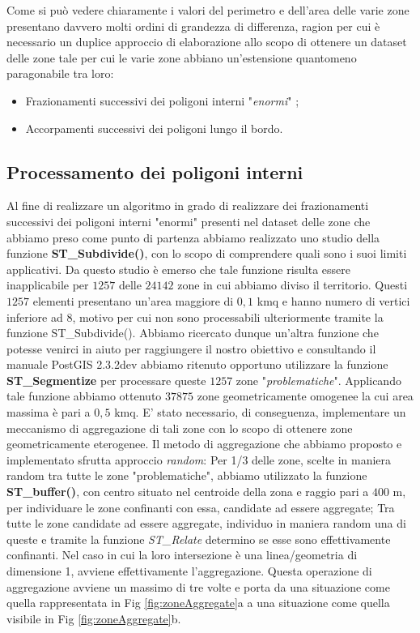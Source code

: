 Come si può vedere chiaramente i valori del perimetro e dell'area delle varie zone presentano davvero molti ordini di grandezza di differenza, ragion per cui è necessario un duplice approccio di elaborazione allo scopo di ottenere un dataset delle zone tale per cui le varie zone abbiano un'estensione quantomeno paragonabile tra loro:
\begin{itemize}
\item Frazionamenti successivi dei poligoni interni "\textit{enormi}" ;
\item Accorpamenti successivi dei poligoni lungo il bordo.
\end{itemize}
\subsection{Processamento dei poligoni interni}
Al fine di realizzare un algoritmo in grado di realizzare dei frazionamenti successivi dei poligoni interni "enormi" presenti nel dataset delle zone che abbiamo preso come punto di partenza abbiamo realizzato uno studio della funzione \textbf{ST\_Subdivide()}, con lo scopo di comprendere quali sono i suoi limiti applicativi. Da questo studio è emerso che tale funzione risulta essere inapplicabile per $1257$ delle $24142$ zone in cui abbiamo diviso il territorio. Questi $1257$ elementi presentano un'area maggiore di $0,1$ kmq e hanno numero di vertici inferiore ad $8$, motivo per cui non sono processabili ulteriormente tramite la funzione ST\_Subdivide().\newline
Abbiamo ricercato dunque un'altra funzione che potesse venirci in aiuto per raggiungere il nostro obiettivo e consultando il manuale PostGIS 2.3.2dev abbiamo ritenuto opportuno utilizzare la funzione \textbf{ST\_Segmentize} per processare queste $1257$ zone "\textit{problematiche}". Applicando tale funzione abbiamo ottenuto $37875$ zone geometricamente omogenee la cui area massima è pari a $0,5$ kmq. E' stato necessario, di conseguenza, implementare un meccanismo di aggregazione di tali zone con lo scopo di ottenere zone geometricamente eterogenee. Il metodo di aggregazione che abbiamo proposto e implementato sfrutta approccio \textit{random}: \newline
Per 1/3 delle zone, scelte in maniera random tra tutte le zone "problematiche", abbiamo utilizzato la funzione \textbf{ST\_buffer()}, con centro situato nel centroide della zona e raggio pari a $400$ m, per individuare le zone confinanti con essa, candidate ad essere aggregate; Tra tutte le zone candidate ad essere aggregate, individuo in maniera random una di queste e tramite la funzione \textit{ST\_Relate} determino se esse sono effettivamente confinanti. Nel caso in cui la loro intersezione è una linea/geometria di dimensione 1, avviene effettivamente l'aggregazione. Questa operazione di aggregazione avviene un massimo di tre volte e porta da una situazione come quella rappresentata in Fig \ref{fig:zoneAggregate}a a una situazione come quella visibile in Fig \ref{fig:zoneAggregate}b.

